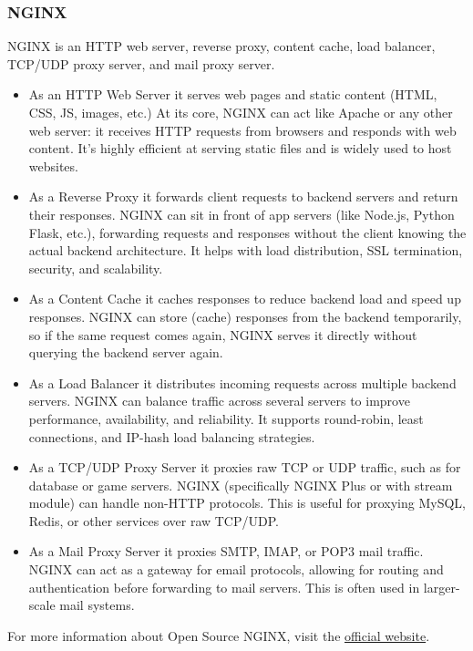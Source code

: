 \subsubsection{NGINX}
NGINX is an HTTP web server, reverse proxy, content cache, load balancer, TCP/UDP proxy server, and mail proxy server.
\begin{itemize}
\item As an HTTP Web Server it serves web pages and static content (HTML, CSS, JS, images, etc.) At its core, NGINX can act like Apache or any other web server: it receives HTTP requests from browsers and responds with web content. It’s highly efficient at serving static files and is widely used to host websites.
\item As a Reverse Proxy it forwards client requests to backend servers and return their responses. NGINX can sit in front of app servers (like Node.js, Python Flask, etc.), forwarding requests and responses without the client knowing the actual backend architecture. It helps with load distribution, SSL termination, security, and scalability.
\item As a Content Cache it caches responses to reduce backend load and speed up responses. NGINX can store (cache) responses from the backend temporarily, so if the same request comes again, NGINX serves it directly without querying the backend server again.
\item As a Load Balancer it distributes incoming requests across multiple backend servers. NGINX can balance traffic across several servers to improve performance, availability, and reliability. It supports round-robin, least connections, and IP-hash load balancing strategies.
\item As a TCP/UDP Proxy Server it proxies raw TCP or UDP traffic, such as for database or game servers. NGINX (specifically NGINX Plus or with stream module) can handle non-HTTP protocols. This is useful for proxying MySQL, Redis, or other services over raw TCP/UDP.
\item As a Mail Proxy Server it proxies SMTP, IMAP, or POP3 mail traffic. NGINX can act as a gateway for email protocols, allowing for routing and authentication before forwarding to mail servers. This is often used in larger-scale mail systems.
\end{itemize}
For more information about Open Source NGINX, visit the \href{https://nginx.org/en/}{official website}.
